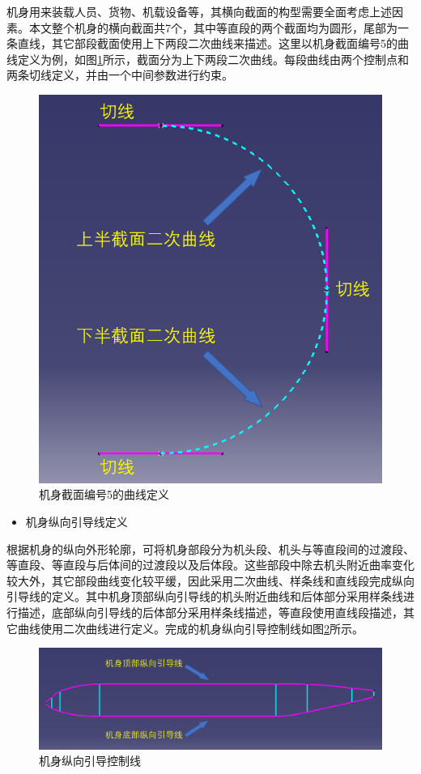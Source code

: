 \documentclass[12pt,a4paper]{report}
\begin{document}
机身用来装载人员、货物、机载设备等，其横向截面的构型需要全面考虑上述因素。本文整个机身的横向截面共7个，其中等直段的两个截面均为圆形，尾部为一条直线，其它部段截面使用上下两段二次曲线来描述。这里以机身截面编号5的曲线定义为例，如图\ref{fig:FuselageSection}所示，截面分为上下两段二次曲线。每段曲线由两个控制点和两条切线定义，并由一个中间参数进行约束。

\begin{figure}[hbt!]
\centering
\includegraphics[width=.8\textwidth]{FuselageSection.PNG}
\caption{机身截面编号5的曲线定义}
\label{fig:FuselageSection}
\end{figure}

\begin{itemize}
    \item[(2)] 机身纵向引导线定义
\end{itemize}

根据机身的纵向外形轮廓，可将机身部段分为机头段、机头与等直段间的过渡段、等直段、等直段与后体间的过渡段以及后体段。这些部段中除去机头附近曲率变化较大外，其它部段曲线变化较平缓，因此采用二次曲线、样条线和直线段完成纵向引导线的定义。其中机身顶部纵向引导线的机头附近曲线和后体部分采用样条线进行描述，底部纵向引导线的后体部分采用样条线描述，等直段使用直线段描述，其它曲线使用二次曲线进行定义。完成的机身纵向引导控制线如图\ref{fig:FuselageGuideLines}所示。

\begin{figure}[hbt!]
\centering
\includegraphics[width=.8\textwidth]{FuselageGuideLines.PNG}
\caption{机身纵向引导控制线}
\label{fig:FuselageGuideLines}
\end{figure}
\end{document}

